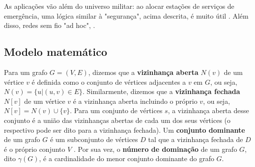 \documentclass[11pt]{article}
\begin{document}
As aplicações vão além do universo militar: ao alocar estações de serviços de emergência, uma lógica similar à "segurança", acima descrita, é muito útil \autocite{GhaffariHadigheh2019Romandominationproblem}. Além disso, redes sem fio "ad hoc", \autocite{Wu2000Dominationitsapplications} .


\subsection{Modelo matemático}
\label{sec:orgcac6fc5}
Para um grafo \(G = (V, E)\), dizemos que a \textbf{vizinhança aberta} \(N(v)\) de um vértice \(v\) é definida como o conjunto de vértices adjacentes a \(v\) em \(G\), ou seja, \(N(v) = \{u|(u, v) \in E\}\).
Similarmente, dizemos que a \textbf{vizinhança fechada} \(N[v]\) de um vértice \(v\) é a vizinhança aberta incluindo o próprio \(v\), ou seja, \(N[v] = N(v) \cup \{v\}\).
Para um conjunto de vértices \(s\), a vizinhança aberta desse conjunto é a união das vizinhanças abertas de cada um dos seus vértices (o respectivo pode ser dito para a vizinhança fechada).
Um \textbf{conjunto dominante} de um grafo \(G\) é um subconjunto de vértices \(D\) tal que a vizinhança fechada de \(D\) é o próprio conjunto \(V\) .
Por sua vez, o \textbf{número de dominação} de um grafo \(G\), dito \(\gamma(G)\), é a cardinalidade do menor conjunto dominante do grafo \(G\).
\end{document}
